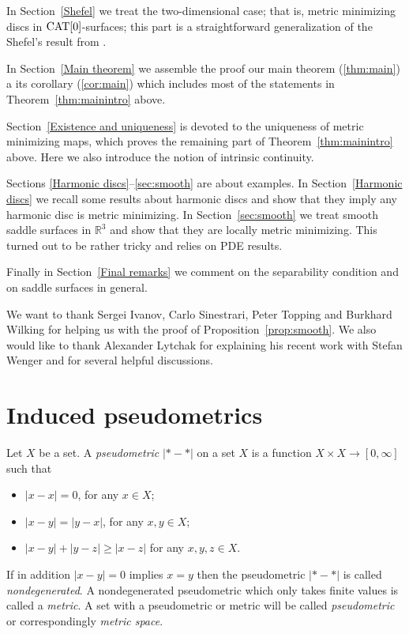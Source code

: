 \documentclass{article}
\begin{document}
In Section~\ref{Shefel} we treat the two-dimensional case; 
that is, metric minimizing discs in $\mathop{\rm CAT}\nolimits[0]$-surfaces;
this part is a straightforward generalization of the Shefel's result from \cite{shefel-2D}. 

In Section~\ref{Main theorem} we assemble the proof our main theorem (\ref{thm:main}) a its corollary (\ref{cor:main}) which includes most of the statements in Theorem~\ref{thm:mainintro} above.

Section~\ref{Existence and uniqueness} is devoted to the uniqueness of metric minimizing maps, which proves the remaining part of Theorem~\ref{thm:mainintro} above.
Here we also introduce the notion of intrinsic continuity. 

Sections \ref{Harmonic discs}--\ref{sec:smooth} are about examples.
In Section~\ref{Harmonic discs} we recall some results about  harmonic discs and show that they imply any harmonic disc is metric minimizing. 
In Section~\ref{sec:smooth} we treat smooth saddle surfaces in $\mathbb{R}^3$ and show that they are locally metric minimizing.
This turned out to be rather tricky and relies on PDE results.

Finally in Section~\ref{Final remarks} we comment on the separability condition and on saddle 
surfaces in general.

We want to thank 
Sergei Ivanov, 
Carlo Sinestrari, 
Peter Topping 
and Burkhard Wilking 
for helping us with the proof of Proposition~\ref{prop:smooth}.
We also would like to thank Alexander Lytchak for explaining his recent work with Stefan Wenger and for several helpful discussions.

\section{Induced  pseudometrics}\label{sec:Def}

Let $X$ be a set.
A \emph{pseudometric} $|{*}-{*}|$ on a set $X$ 
is a function $X\times X\to[0,\infty]$
such that 
\begin{itemize}
\item $|x-x|=0$, for any $x\in X$;
\item $|x-y|=|y-x|$, for any $x,y\in X$;
\item $|x-y|+|y-z|\ge|x-z|$ for any  $x,y,z\in X$.
\end{itemize}
If in addition $|x-y|=0$ implies $x=y$ then the pseudometric $|{*}-{*}|$ is called \emph{nondegenerated}.
A nondegenerated pseudometric which only takes finite values is called a \emph{metric}. 
A set with a pseudometric or metric will be called \emph{pseudometric} or correspondingly \emph{metric space}.
\end{document}
